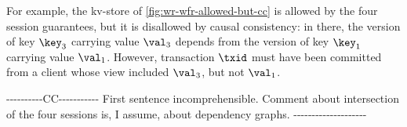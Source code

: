 %
%
%
For example, the kv-store of 
\cref{fig:wr-wfr-allowed-but-cc} is allowed by the four session guarantees, but it is disallowed by 
causal consistency: in there, the version of key $\key_3$ carrying value $\val_3$ depends from the version 
of key $\key_1$ carrying value $\val_1$. However, transaction $\txid$ must have been committed from 
a client whose view included $\val_3$, but not $\val_1$.

\ac{
----------CC-----------

First sentence incomprehensible.

Comment about intersection of the four sessions is, I assume, about
dependency graphs.


--------------------
}

